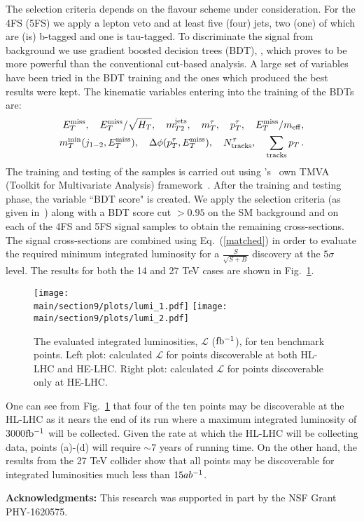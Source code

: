 The selection criteria depends on the flavour scheme under consideration. For the 4FS (5FS) we apply a lepton veto and at least five (four) jets, two (one) of which are (is) b-tagged and one is tau-tagged. To discriminate the signal from background we use gradient boosted decision trees (BDT), , which proves to be more powerful than the conventional cut-based analysis. A large set of variables have been tried in the BDT training and the ones which produced the best results were kept. The kinematic variables entering into the training of the BDTs are: 
\begin{align}
E^{\rm miss}_T, ~~~ E^{\rm miss}_T/\sqrt{H_T}, ~~~m_{T2}^{\rm jets}, ~~~m_T^{\tau}, ~~~p_T^{\tau}, ~~~E^{\rm miss}_T/m_{\rm eff},  \nonumber \\
m_T^{\rm min}(j_{1-2},E^{\rm miss}_T), ~~~\Delta\phi(p^{\tau}_T,E^{\rm miss}_T), ~~~N_{\rm tracks}^{\tau}, ~~~\sum_{\rm tracks} p_T \, .
\end{align}
The training and testing of the samples is carried out using 's~\cite{Antcheva:2011zz} own TMVA (Toolkit for Multivariate Analysis) framework~\cite{Speckmayer:2010zz}. After the training and testing phase, the variable ``BDT score" is created. We apply the selection criteria (as given in~\cite{Aboubrahim:2018tpf}) along with a BDT score cut $>0.95$ on the SM background and on each of the 4FS and 5FS signal samples to obtain the remaining cross-sections. The signal cross-sections are combined using Eq.~(\ref{matched}) in order to evaluate the required minimum integrated luminosity for a $\frac{S}{\sqrt{S+B}}$ discovery at the $5\sigma$ level. The results for both the 14 and 27 TeV cases are shown in Fig.~\ref{fig1}. 

\begin{figure}[H]
 \centering
   \texttt{[image: \\main/section9/plots/lumi\_1.pdf]} 
      \texttt{[image: \\main/section9/plots/lumi\_2.pdf]}
   \caption{The evaluated integrated luminosities, $\mathcal{L}$ ($\mbox{fb$^{-1}$}$), for ten benchmark points. Left plot: calculated $\mathcal{L}$ for points discoverable at both HL-LHC and HE-LHC. Right plot: calculated $\mathcal{L}$ for points discoverable only at HE-LHC.}
	\label{fig1}
\end{figure}

One can see from Fig.~\ref{fig1} that four of the ten points may be discoverable at the HL-LHC as it nears the end of its run where a maximum integrated luminosity of 3000$\mbox{fb$^{-1}$}$ will be collected. Given the rate at which the HL-LHC will be collecting data, points (a)-(d) will require $\sim 7$ years of running time. On the other hand, the results from the 27 TeV collider show that all points may be discoverable for integrated luminosities much less than $15ab^{-1}$. %


\textbf{Acknowledgments:}
This research was supported in part by the NSF Grant PHY-1620575.
